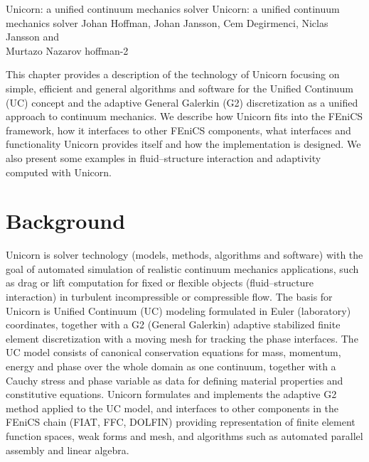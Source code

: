               {Unicorn: a unified continuum mechanics solver}
              {Unicorn: a unified continuum mechanics solver}
              {Johan Hoffman, Johan Jansson, Cem Degirmenci,
                Niclas Jansson and \\ Murtazo Nazarov}
              {hoffman-2}


This chapter provides a description of the technology of Unicorn
focusing on simple, efficient and general algorithms and software for
the Unified Continuum (UC) concept and the adaptive General Galerkin
(G2) discretization as a unified approach to continuum mechanics. We
describe how Unicorn fits into the FEniCS framework, how it interfaces
to other FEniCS components, what interfaces and functionality Unicorn
provides itself and how the implementation is designed. We also
present some examples in fluid--structure interaction and adaptivity
computed with Unicorn.

\section{Background}

Unicorn is solver technology (models, methods, algorithms and
software) with the goal of automated simulation of realistic continuum
mechanics applications, such as drag or lift computation for fixed or
flexible objects (fluid--structure interaction) in turbulent
incompressible or compressible flow. The basis for Unicorn is Unified
Continuum (UC) modeling \citep{HoffmanJanssonStockli2011} formulated
in Euler (laboratory) coordinates, together with a G2 (General
Galerkin) adaptive stabilized finite element discretization with a
moving mesh for tracking the phase interfaces. The UC model consists
of canonical conservation equations for mass, momentum, energy and
phase over the whole domain as one continuum, together with a Cauchy
stress and phase variable as data for defining material properties and
constitutive equations. Unicorn formulates and implements the adaptive
G2 method applied to the UC model, and interfaces to other components
in the FEniCS chain (FIAT, FFC, DOLFIN) providing representation of
finite element function spaces, weak forms and mesh, and algorithms
such as automated parallel assembly and linear algebra.


